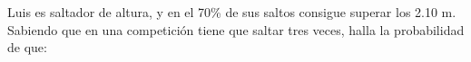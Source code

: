 \documentclass[addpoints,spanish, 12pt,a4paper]{exam}
\begin{document}
\begin{questions}





\question Luis es saltador de altura, y en el 70\% de sus saltos consigue superar los 2.10 m. Sabiendo que en una competición tiene que saltar tres veces, halla la probabilidad de que:


\end{questions}
\end{document}
